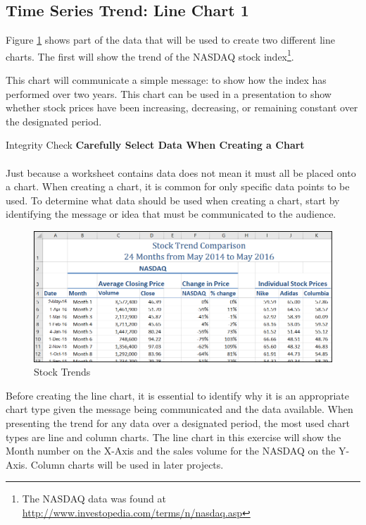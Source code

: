 \subsection{Time Series Trend: Line Chart 1}

Figure \ref{04:fig01} shows part of the data that will be used to create two different line charts. The first will show the trend of the NASDAQ stock index\footnote{The NASDAQ data was found at \url{http://www.investopedia.com/terms/n/nasdaq.asp}}.

This chart will communicate a simple message: to show how the index has performed over two years. This chart can be used in a presentation to show whether stock prices have been increasing, decreasing, or remaining constant over the designated period.

\begin{center}
	\begin{infobox}{Integrity Check}
		\textbf{Carefully Select Data When Creating a Chart}
		\\
		\\
		Just because a worksheet contains data does not mean it must all be placed onto a chart. When creating a chart, it is common for only specific data points to be used. To determine what data should be used when creating a chart, start by identifying the message or idea that must be communicated to the audience.
	\end{infobox}
\end{center}

\begin{figure}[H]
	\centering
	\includegraphics[width=\maxwidth{.95\linewidth}]{gfx/ch04_fig01}
	\caption{Stock Trends}
	\label{04:fig01}
\end{figure}

Before creating the line chart, it is essential to identify why it is an appropriate chart type given the message being communicated and the data available. When presenting the trend for any data over a designated period, the most used chart types are line and column charts. The line chart in this exercise will show the Month number on the X-Axis and the sales volume for the NASDAQ on the Y-Axis. Column charts will be used in later projects.

